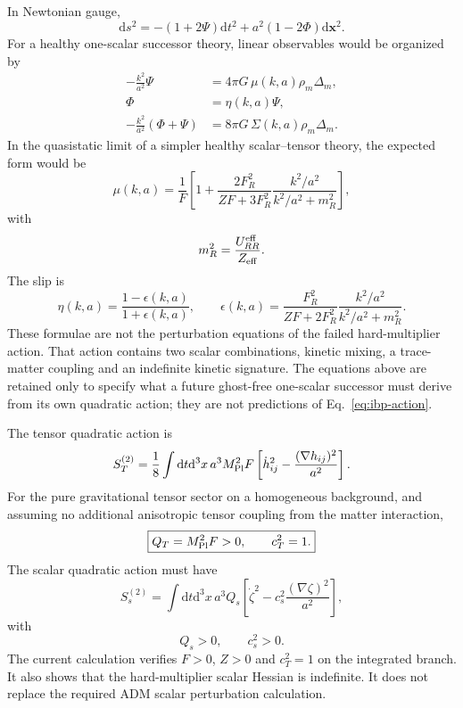\documentclass[12pt,a4paper]{article}
\newcommand{\dd}{\mathrm{d}}
\begin{document}
In Newtonian gauge,
\begin{equation}
\dd s^2=-(1+2\Psi)\dd t^2+a^2(1-2\Phi)\dd\mathbf x^2.
\end{equation}
For a healthy one-scalar successor theory, linear observables would be organized by
\begin{align}
-\frac{k^2}{a^2}\Psi&=4\pi G\,\mu(k,a)\rho_m\Delta_m,\label{eq:mu}\\
\Phi&=\eta(k,a)\Psi,\label{eq:eta}\\
-\frac{k^2}{a^2}(\Phi+\Psi)&=8\pi G\,\Sigma(k,a)\rho_m\Delta_m.
\label{eq:sigma}
\end{align}
In the quasistatic limit of a simpler healthy scalar--tensor theory, the expected form would be
\begin{equation}
\mu(k,a)=\frac1F\left[1+\frac{2F_R^2}{ZF+3F_R^2}
\frac{k^2/a^2}{k^2/a^2+m_R^2}\right],
\label{eq:mu-form}
\end{equation}
with
\begin{equation}
m_R^2=\frac{U_{RR}^{\rm eff}}{Z_{\rm eff}}.
\end{equation}
The slip is
\begin{equation}
\eta(k,a)=\frac{1-\epsilon(k,a)}{1+\epsilon(k,a)},
\qquad
\epsilon(k,a)=\frac{F_R^2}{ZF+2F_R^2}
\frac{k^2/a^2}{k^2/a^2+m_R^2}.
\label{eq:eta-form}
\end{equation}
These formulae are not the perturbation equations of the failed hard-multiplier action. That action contains two scalar combinations, kinetic mixing, a trace-matter coupling and an indefinite kinetic signature. The equations above are retained only to specify what a future ghost-free one-scalar successor must derive from its own quadratic action; they are not predictions of Eq.~\eqref{eq:ibp-action}.

The tensor quadratic action is
\begin{equation}
S_T^{(2)}=\frac18\int\dd t\dd^3x\,a^3M_{\rm Pl}^2F
\left[\dot h_{ij}^2-\frac{(\nabla h_{ij})^2}{a^2}\right].
\label{eq:tensorlocked}
\end{equation}
For the pure gravitational tensor sector on a homogeneous background, and assuming no additional anisotropic tensor coupling from the matter interaction,
\begin{equation}
\boxed{Q_T=M_{\rm Pl}^2F>0,\qquad c_T^2=1.}
\label{eq:tensor-gates}
\end{equation}
The scalar quadratic action must have
\begin{equation}
S_s^{(2)}=\int\dd t\dd^3x\,a^3Q_s
\left[\dot\zeta^2-c_s^2\frac{(\nabla\zeta)^2}{a^2}\right],
\end{equation}
with
\begin{equation}
\boxed{Q_s>0,\qquad c_s^2>0.}
\label{eq:scalar-stability}
\end{equation}
The current calculation verifies $F>0$, $Z>0$ and $c_T^2=1$ on the integrated branch. It also shows that the hard-multiplier scalar Hessian is indefinite. It does not replace the required ADM scalar perturbation calculation.
\end{document}

